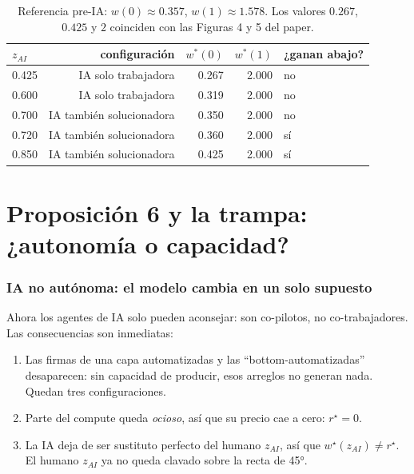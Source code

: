\documentclass[11pt]{article}
\theoremstyle{definition}
\theoremstyle{remark}
\newcommand{\zai}{z_{AI}}
\begin{document}
\begin{table}[h]
\centering
\begin{tabular}{@{}lrrrl@{}}
\toprule
$\zai$ & configuración & $w^{*}(0)$ & $w^{*}(1)$ & ¿ganan abajo? \\ \midrule
0.425 & IA solo trabajadora   & 0.267 & 2.000 & no \\
0.600 & IA solo trabajadora   & 0.319 & 2.000 & no \\
0.700 & IA también solucionadora & 0.350 & 2.000 & no \\
0.720 & IA también solucionadora & 0.360 & 2.000 & sí \\
0.850 & IA también solucionadora & 0.425 & 2.000 & sí \\ \bottomrule
\end{tabular}
\caption{Referencia pre-IA: $w(0)\approx0.357$, $w(1)\approx1.578$. Los valores $0.267$, $0.425$ y $2$
coinciden con las Figuras 4 y 5 del paper.}
\end{table}

\part{Proposición 6 y la trampa: ¿autonomía o capacidad?}

\section{IA no autónoma: el modelo cambia en un solo supuesto}

Ahora los agentes de IA solo pueden aconsejar: son co-pilotos, no co-trabajadores. Las consecuencias
son inmediatas:

\begin{enumerate}[label=(\roman*)]
  \item Las firmas de una capa automatizadas y las ``bottom-automatizadas'' desaparecen: sin capacidad de
  producir, esos arreglos no generan nada. Quedan tres configuraciones.
  \item Parte del compute queda \emph{ocioso}, así que su precio cae a cero: $r^{\star}=0$.
  \item La IA deja de ser sustituto perfecto del humano $\zai$, así que $w^{\star}(\zai)\neq r^{\star}$.
  El humano $\zai$ ya no queda clavado sobre la recta de 45°.
\end{enumerate}
\end{document}
